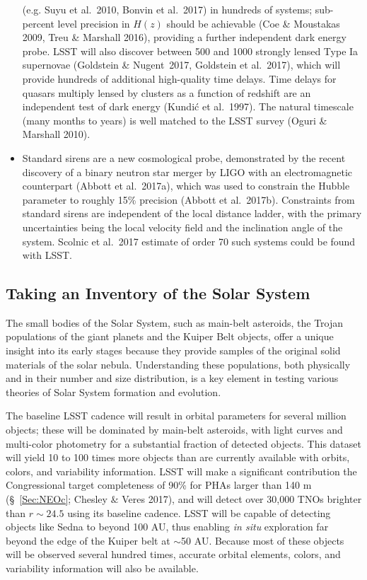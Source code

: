 \begin{itemize}
(e.g. Suyu et al.~2010, Bonvin et al.~2017) in hundreds of systems; sub-percent level precision in
$H(z)$ should be achievable (Coe \& Moustakas 2009, Treu \& Marshall 2016), providing a further independent dark energy probe.
LSST will also discover between 500 and 1000 strongly lensed Type Ia supernovae (Goldstein \& Nugent~2017, Goldstein et al.~2017), which will provide hundreds of additional high-quality time delays.
Time delays for quasars multiply lensed by clusters as a function of redshift are an independent test
of dark energy (Kundi\'{c} et al.~1997). The natural timescale (many months to years) is well matched
to the LSST survey (Oguri \& Marshall 2010).
\item Standard sirens are a new cosmological probe, demonstrated by the recent discovery of a binary
  neutron star merger by LIGO with an electromagnetic counterpart (Abbott et al.~2017a), which was
  used to constrain the Hubble parameter to roughly 15\% precision (Abbott et al.~2017b).
  Constraints from standard sirens are independent of the local distance ladder, with the primary
  uncertainties being the local velocity field and the inclination angle of the system.  Scolnic et
  al.~2017 estimate of order 70 such systems could be found with LSST.
\end{itemize}


\subsection{Taking an Inventory of the Solar System}



The small bodies of the Solar System, such as main-belt asteroids,
the Trojan populations of the giant planets and the Kuiper Belt objects,
offer a unique insight into its early stages because they provide
samples of the original solid materials of the solar nebula.
Understanding these populations, both physically and in their number
and size distribution, is a key element in testing various theories of
Solar System formation and evolution.

The baseline LSST cadence will result in orbital parameters for several
million objects; these will be dominated by main-belt asteroids, with
light curves and multi-color photometry for a substantial fraction of detected objects.
This dataset will yield 10 to 100 times more objects than are currently
available with orbits, colors, and variability information. LSST will make a significant contribution the Congressional target
completeness of 90\% for PHAs larger than 140 m (\S~\ref{Sec:NEOc}; Chesley $\&$ Veres 2017), and will detect over 30,000 TNOs brighter than $r\sim24.5$ using its baseline cadence. LSST will be capable
of detecting objects like Sedna to beyond 100 AU, thus enabling {\it in situ} exploration
far beyond the edge of the Kuiper belt at $\sim$50 AU. Because most of these
objects will be observed several hundred times, accurate orbital elements,
colors, and variability information will also be available.



